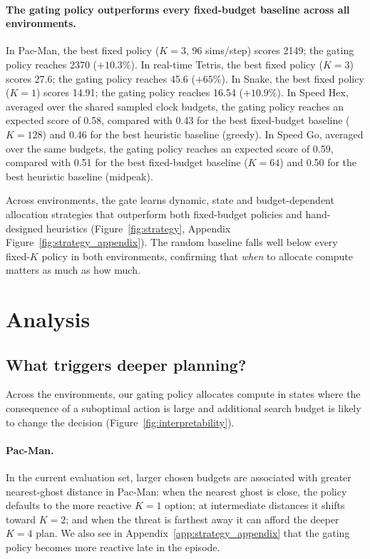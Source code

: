 \documentclass{article}
\begin{document}
\paragraph{The gating policy outperforms every fixed-budget baseline across all environments.} In Pac-Man, the best fixed policy ($K{=}3$, 96 sims/step) scores 2149; the gating policy reaches 2370 ($+10.3\%$). In real-time Tetris, the best fixed policy ($K{=}3$) scores 27.6; the gating policy reaches 45.6 ($+65\%$).  In Snake, the best fixed policy ($K{=}1$) scores 14.91; the gating policy reaches 16.54 ($+10.9\%$). In Speed Hex, averaged over the shared sampled clock budgets, the gating policy reaches an expected score of 0.58, compared with 0.43 for the best fixed-budget baseline ($K{=}128$) and 0.46 for the best heuristic baseline (greedy). In Speed Go, averaged over the same budgets, the gating policy reaches an expected score of 0.59, compared with 0.51 for the best fixed-budget baseline ($K{=}64$) and 0.50 for the best heuristic baseline (midpeak).

Across environments, the gate learns dynamic, state and budget-dependent allocation strategies that outperform both fixed-budget policies and hand-designed heuristics (Figure~\ref{fig:strategy}, Appendix Figure~\ref{fig:strategy_appendix}).
The random baseline falls well below every fixed-$K$ policy in both environments, confirming that \emph{when} to allocate compute matters as much as how much.

\section{Analysis}
\label{sec:discussion}

\subsection{What triggers deeper planning?}
\label{subsec:whattriggersdeeperplanning}

Across the environments, our gating policy allocates compute in
states where the consequence of a suboptimal action is large and additional search
budget is likely to change the decision (Figure~\ref{fig:interpretability}).

\paragraph{Pac-Man.}

In the current evaluation set, larger chosen budgets are associated with greater
nearest-ghost distance in Pac-Man: when the nearest ghost is close, the policy
defaults to the more reactive $K{=}1$ option; at intermediate distances it shifts
toward $K{=}2$; and when the threat is farthest away it can afford the deeper
$K{=}4$ plan. We also see in Appendix~\ref{app:strategy_appendix} that the
gating policy becomes more reactive late in the episode.
\end{document}
